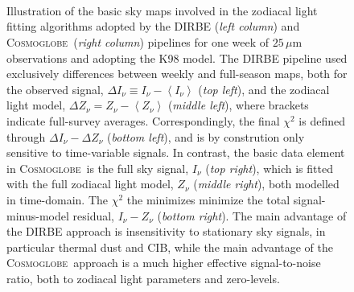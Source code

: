 \documentclass[twocolumn]{aa}
\def\Cosmoglobe{\textsc{Cosmoglobe}}
\begin{document}
\begin{figure}
    \centering
    \\
    \\
    \\
    \caption{Illustration of the basic sky maps involved in the zodiacal 
    light fitting algorithms adopted by the DIRBE (\emph{left column}) 
    and \Cosmoglobe\ (\emph{right column}) pipelines for one week of 
    $25\,\mu\mathrm{m}$ observations and adopting the K98 model. The 
    DIRBE pipeline used exclusively differences between weekly and 
    full-season maps, both for the observed signal, 
    $\Delta I_{\nu} \equiv I_{\nu}-\left<I_{\nu}\right>$ (\emph{top left}), 
    and the zodiacal light model, 
    $\Delta Z_{\nu} = Z_{\nu}-\left<Z_{\nu}\right>$ (\emph{middle left}), 
    where brackets indicate full-survey averages. Correspondingly, the 
    final $\chi^2$ is defined through $\Delta I_{\nu} - \Delta Z_{\nu}$ 
    (\emph{bottom left}), and is by constrution only sensitive to 
    time-variable signals. In contrast, the basic data element in 
    \Cosmoglobe\ is the full sky signal, $I_{\nu}$ (\emph{top right}), 
    which is fitted with the full zodiacal light model, $Z_{\nu}$ 
    (\emph{middle right}), both modelled in time-domain. The $\chi^2$ 
    the minimizes minimize the total signal-minus-model residual, 
    $I_{\nu}-Z_{\nu}$ (\emph{bottom right}). The main advantage of the 
    DIRBE approach is insensitivity to stationary sky signals, in 
    particular thermal dust and CIB, while the main advantage of the 
    \Cosmoglobe\ approach is a much higher effective signal-to-noise 
    ratio, both to zodiacal light parameters and zero-levels.}
    \label{fig:week_vs_full}
\end{figure}
\end{document}
